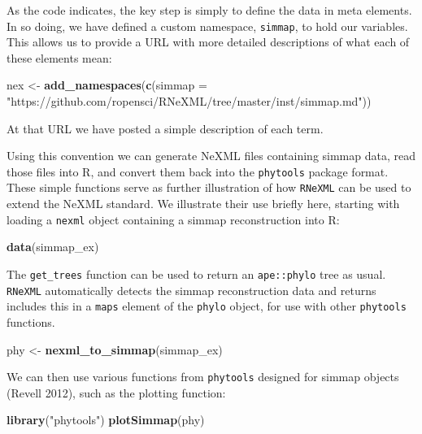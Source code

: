 \documentclass[author-year, review, 11pt]{components/elsarticle} %
\newenvironment{Shaded}{\begin{snugshade}}{\end{snugshade}}
\newcommand{\KeywordTok}[1]{\textcolor[rgb]{0.13,0.29,0.53}{\textbf{{#1}}}}
\newcommand{\DataTypeTok}[1]{\textcolor[rgb]{0.13,0.29,0.53}{{#1}}}
\newcommand{\StringTok}[1]{\textcolor[rgb]{0.31,0.60,0.02}{{#1}}}
\newcommand{\NormalTok}[1]{{#1}}
\begin{document}
As the code indicates, the key step is simply to define the data in meta
elements. In so doing, we have defined a custom namespace,
\texttt{simmap}, to hold our variables. This allows us to provide a URL
with more detailed descriptions of what each of these elements mean:

\begin{Shaded}
\begin{Highlighting}[]
\NormalTok{nex <-}\StringTok{ }\KeywordTok{add_namespaces}\NormalTok{(}\KeywordTok{c}\NormalTok{(}\DataTypeTok{simmap =} \StringTok{"https://github.com/ropensci/RNeXML/tree/master/inst/simmap.md"}\NormalTok{))}
\end{Highlighting}
\end{Shaded}

At that URL we have posted a simple description of each term.

Using this convention we can generate NeXML files containing simmap
data, read those files into R, and convert them back into the
\texttt{phytools} package format. These simple functions serve as
further illustration of how \texttt{RNeXML} can be used to extend the
NeXML standard. We illustrate their use briefly here, starting with
loading a \texttt{nexml} object containing a simmap reconstruction into
R:

\begin{Shaded}
\begin{Highlighting}[]
\KeywordTok{data}\NormalTok{(simmap_ex)}
\end{Highlighting}
\end{Shaded}

The \texttt{get\_trees} function can be used to return an
\texttt{ape::phylo} tree as usual. \texttt{RNeXML} automatically detects
the simmap reconstruction data and returns includes this in a
\texttt{maps} element of the \texttt{phylo} object, for use with other
\texttt{phytools} functions.

\begin{Shaded}
\begin{Highlighting}[]
\NormalTok{phy <-}\StringTok{ }\KeywordTok{nexml_to_simmap}\NormalTok{(simmap_ex)}
\end{Highlighting}
\end{Shaded}

We can then use various functions from \texttt{phytools} designed for
simmap objects (Revell 2012), such as the plotting function:

\begin{Shaded}
\begin{Highlighting}[]
\KeywordTok{library}\NormalTok{(}\StringTok{"phytools"}\NormalTok{)}
\KeywordTok{plotSimmap}\NormalTok{(phy)}
\end{Highlighting}
\end{Shaded}
\end{document}
